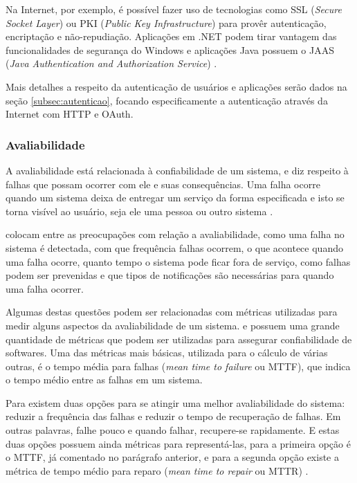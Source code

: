 \documentclass[diss]{template/setrem}
\begin{document}
Na Internet, por exemplo, é possível fazer uso de tecnologias como SSL (\emph{Secure Socket Layer}) ou PKI (\emph{Public Key Infrastructure}) para provêr autenticação, encriptação e não-repudiação. Aplicações em .NET podem tirar vantagem das funcionalidades de segurança do Windows e aplicações Java possuem o JAAS (\emph{Java Authentication and Authorization Service}) \citep{Gorton2011}.

Mais detalhes a respeito da autenticação de usuários e aplicações serão dados na seção \ref{subsec:autenticao}, focando especificamente a autenticação através da Internet com HTTP e OAuth.

\subsubsection{Avaliabilidade}
A avaliabilidade está relacionada à confiabilidade de um sistema, e diz respeito à falhas que possam ocorrer com ele e suas consequências. Uma falha ocorre quando um sistema deixa de entregar um serviço da forma especificada e isto se torna visível ao usuário, seja ele uma pessoa ou outro sistema \citep{Gorton2011, Bass2003}.

\citet{Bass2003} colocam entre as preocupações com relação a avaliabilidade, como uma falha no sistema é detectada, com que frequência falhas ocorrem, o que acontece quando uma falha ocorre, quanto tempo o sistema pode ficar fora de serviço, como falhas podem ser prevenidas e que tipos de notificações são necessárias para quando uma falha ocorrer.

Algumas destas questões podem ser relacionadas com métricas utilizadas para medir alguns aspectos da avaliabilidade de um sistema. \citet{IEEE1996} e \citet{IEEE2005} possuem uma grande quantidade de métricas que podem ser utilizadas para assegurar confiabilidade de softwares. Uma das métricas mais básicas, utilizada para o cálculo de várias outras, é o tempo média para falhas (\emph{mean time to failure} ou MTTF), que indica o tempo médio entre as falhas em um sistema.

Para \citet{Vogel2011} existem duas opções para se atingir uma melhor avaliabilidade do sistema: reduzir a frequência das falhas e reduzir o tempo de recuperação de falhas. Em outras palavras, falhe pouco e quando falhar, recupere-se rapidamente. E estas duas opções possuem ainda métricas para representá-las, para a primeira opção é o MTTF, já comentado no parágrafo anterior, e para a segunda opção existe a métrica de tempo médio para reparo (\emph{mean time to repair} ou MTTR) \citep{IEEE2005}.
\end{document}
